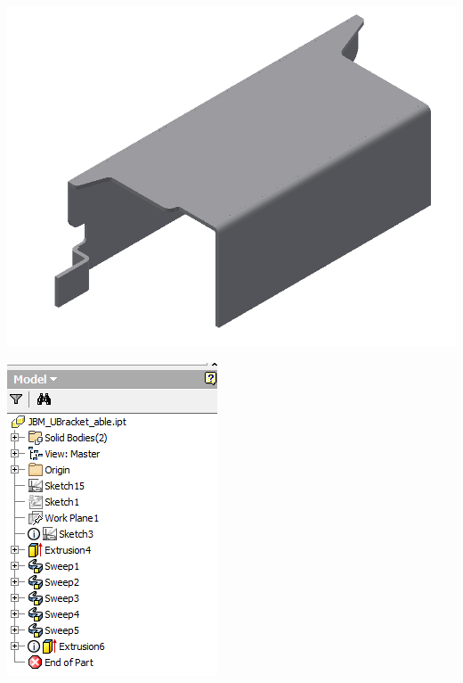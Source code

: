 \begin{minipage}{\linewidth}
\begin{minipage}[c]{0.62\linewidth}
\includegraphics[width=\linewidth,valign=t]{../Common/images/JBM_UBracket_Able_model}
 \label{fig:results:JBM_UBracket_Able_model}
\end{minipage}
\quad
\begin{minipage}[c]{0.3\linewidth}
\includegraphics[width=\linewidth,valign=t]{../Common/images/JBM_UBracket_Able_tree}

\end{minipage}
\end{minipage}

